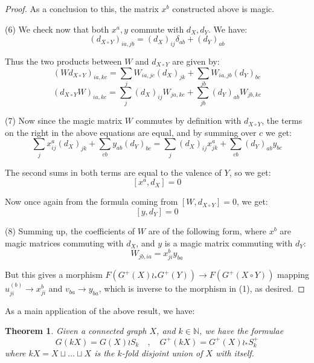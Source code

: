 \documentclass[12pt]{amsbook}
\newtheorem{theorem}{Theorem}[chapter]
\begin{document}
\begin{proof}
As a conclusion to this, the matrix $x^b$ constructed above is magic. 

\medskip

(6) We check now that both $x^a,y$ commute with $d_X,d_Y$. We have:
$$(d_{X\circ Y})_{ia,jb} = (d_X)_{ij}\delta_{ab} + (d_Y)_{ab}$$

Thus the two products between $W$ and $d_{X\circ Y}$ are given by:
$$(Wd_{X\circ Y})_{ia,kc}=\sum_j W_{ia,jc} (d_X)_{jk} + \sum_{jb}W_{ia,jb}(d_Y)_{bc}$$
$$(d_{X\circ Y}W)_{ia,kc}=\sum_j (d_X)_{ij} W_{ja,kc} + \sum_{jb}(d_Y)_{ab}W_{jb,kc}$$

(7) Now since the magic matrix $W$ commutes by definition with $d_{X\circ Y}$, the terms on the right in the above equations are equal, and by summing over $c$ we get:
$$\sum_j x_{ij}^a(d_X)_{jk} + \sum_{cb} y_{ab}(d_Y)_{bc}
= \sum_{j} (d_X)_{ij}x_{jk}^a + \sum_{cb} (d_Y)_{ab}y_{bc}$$

The second sums in both terms are equal to the valence of $Y$, so we get:
$$[x^a,d_X]=0$$

Now once again from the formula coming from $[W,d_{X\circ Y}]=0$, we get:
$$[y,d_Y] =0$$

(8) Summing up, the coefficients of $W$ are of the following form, where $x^b$ are magic matrices commuting with $d_X$, and $y$ is a magic matrix commuting with $d_Y$: 
$$W_{jb,ia}=x_{ji}^by_{ba}$$

But this gives a morphism $F(G^+(X)\wr_*G^+(Y))\to F(G^+(X\circ Y))$ mapping $u_{ji}^{(b)}\to x_{ji}^b$ and $v_{ba}\to y_{ba}$, which is inverse to the morphism in (1), as desired.
\end{proof}

As a main application of the above result, we have:


\begin{theorem}
Given a connected graph $X$, and $k\in\mathbb N$, we have the formulae
$$G(kX)=G(X)\wr S_k\quad,\quad 
G^+(kX)=G^+(X)\wr_*S_k^+$$
where $kX=X\sqcup\ldots\sqcup X$ is the $k$-fold disjoint union of $X$ with itself.
\end{theorem}
\end{document}
